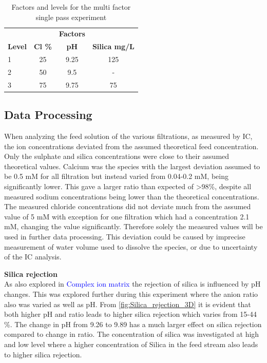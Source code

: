 \begin{table}[H]
\centering
\caption{Factors and levels for the multi factor single pass experiment}
\label{tab:SPRR_factors_levels}
\begin{tabular}{l|ccc}
\rowcolor{gray!50}
  &  & \textbf{Factors} &   \\ 
  \rowcolor{gray!50}
\textbf{Level}   & \textbf{Cl \%} & \textbf{pH} & \textbf{Silica mg/L}  \\ \hline
1   & 25             & 9.25  & 125    \\
2   & 50               & 9.5   & -      \\
3  & 75               & 9.75  & 75    \\
\end{tabular}
\end{table}
 
 
\subsection{Data Processing} 

When analyzing the feed solution of the various filtrations, as measured by IC, the ion concentrations deviated from the assumed theoretical feed concentration. 
Only the sulphate and silica concentrations were close to their assumed theoretical values. 
Calcium was the species with the largest deviation assumed to be 0.5 mM for all filtration but instead varied from 0.04-0.2 mM, being significantly lower.
This gave a larger  ratio than expected of >98\%, despite all measured sodium concentrations being lower than the theoretical concentrations.
The measured chloride concentrations did not deviate much from the assumed value of 5 mM with exception for one filtration which had a concentration 2.1 mM, changing the  value significantly.
Therefore solely the measured values will be used in further data processing. 
This deviation could be caused by imprecise measurement of water volume used to dissolve the species, or due to uncertainty of the IC analysis. 

\textbf{Silica rejection }\\
As also explored in \textcolor{blue}{Complex ion matrix} the rejection of silica is influenced by pH changes. 
This was explored further during this experiment where the anion ratio also was varied as well as pH. 
From \cref{fig:Silica_rejection_3D} it is evident that both higher pH and  ratio leads to higher silica rejection which varies from 15-44 \%. The change in pH from 9.26 to 9.89 has a much larger effect on silica rejection compared to change in  ratio. 
The concentration of silica was investigated at high and low level where a higher concentration of Silica in the feed stream also leads to higher silica rejection. 

